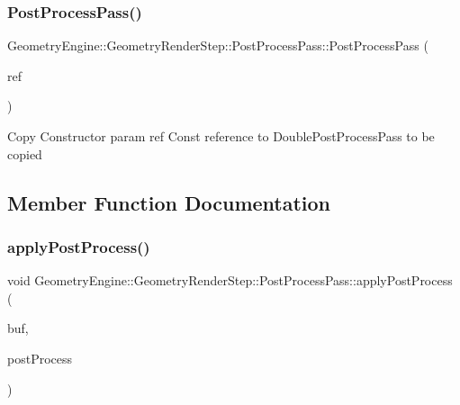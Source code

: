 \subsubsection{\texorpdfstring{PostProcessPass()}{PostProcessPass()}}
{\footnotesize\ttfamily Geometry\+Engine\+::\+Geometry\+Render\+Step\+::\+Post\+Process\+Pass\+::\+Post\+Process\+Pass (\begin{DoxyParamCaption}\item[{const \mbox{\hyperlink{class_geometry_engine_1_1_geometry_render_step_1_1_post_process_pass}{Post\+Process\+Pass}} \&}]{ref }\end{DoxyParamCaption})\hspace{0.3cm}{\ttfamily [inline]}}

Copy Constructor param ref Const reference to Double\+Post\+Process\+Pass to be copied 

\subsection{Member Function Documentation}
\mbox{\label{class_geometry_engine_1_1_geometry_render_step_1_1_post_process_pass_ac0f109e5dc7fb598c2613daaff285526}} 
\subsubsection{\texorpdfstring{applyPostProcess()}{applyPostProcess()}}
{\footnotesize\ttfamily void Geometry\+Engine\+::\+Geometry\+Render\+Step\+::\+Post\+Process\+Pass\+::apply\+Post\+Process (\begin{DoxyParamCaption}\item[{\mbox{\hyperlink{class_geometry_engine_1_1_geometry_buffer_1_1_g_buffer}{Geometry\+Buffer\+::\+G\+Buffer}} $\ast$}]{buf,  }\item[{const std\+::list$<$ \mbox{\hyperlink{class_geometry_engine_1_1_geometry_post_process_1_1_post_process}{Geometry\+Post\+Process\+::\+Post\+Process}} $\ast$ $>$ \&}]{post\+Process }\end{DoxyParamCaption})\hspace{0.3cm}{\ttfamily [protected]}}

